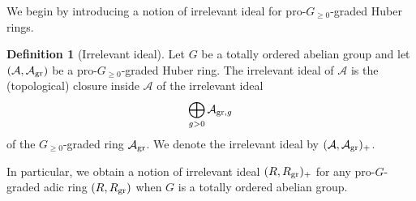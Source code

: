 \documentclass[12pt,twoside,a4paper]{article}
\theoremstyle{definition}
\newtheorem{mydef}[thm]{Definition}
\theoremstyle{remark}
\newcommand\gr{{\rm gr}}
\begin{document}
We begin by introducing a notion of irrelevant ideal for pro-$G_{\geq0}$-graded Huber rings.  
\begin{mydef}[Irrelevant ideal]\label{Irrelevant ideal}Let $G$ be a totally ordered abelian group and let $(\mathcal{A}, \mathcal{A}_{\gr})$ be a pro-$G_{\geq0}$-graded Huber ring. The irrelevant ideal of $\mathcal{A}$ is the (topological) closure inside $\mathcal{A}$ of the irrelevant ideal \begin{equation*}\bigoplus_{g>0}\mathcal{A}_{\gr, g}\end{equation*}of the $G_{\geq0}$-graded ring $\mathcal{A}_{\gr}$. We denote the irrelevant ideal by $(\mathcal{A}, \mathcal{A}_{\gr})_{+}$. \end{mydef}
In particular, we obtain a notion of irrelevant ideal $(R, R_{\gr})_{+}$ for any pro-$G$-graded adic ring $(R, R_{\gr})$ when $G$ is a totally ordered abelian group. 
\end{document}
